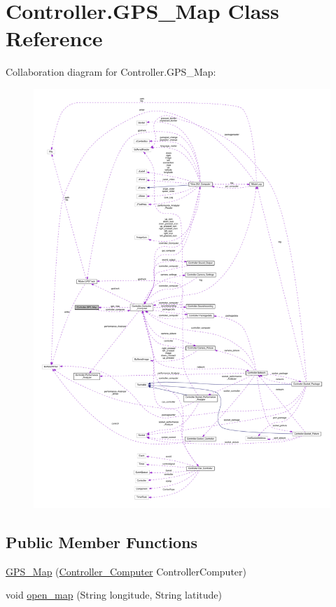 \hypertarget{class_controller_1_1_g_p_s___map}{}\section{Controller.\+G\+P\+S\+\_\+\+Map Class Reference}
\label{class_controller_1_1_g_p_s___map}


Collaboration diagram for Controller.\+G\+P\+S\+\_\+\+Map\+:
\nopagebreak
\begin{figure}[H]
\begin{center}
\leavevmode
\includegraphics[width=350pt]{class_controller_1_1_g_p_s___map__coll__graph}
\end{center}
\end{figure}
\subsection*{Public Member Functions}
\begin{DoxyCompactItemize}
\item 
\hyperlink{class_controller_1_1_g_p_s___map_a8e67453476139ace5eff961e3bb82a21}{G\+P\+S\+\_\+\+Map} (\hyperlink{class_controller_1_1_controller___computer}{Controller\+\_\+\+Computer} Controller\+Computer)
\item 
void \hyperlink{class_controller_1_1_g_p_s___map_a3464e3a900a1d878cb4487448b23fd7b}{open\+\_\+map} (String longitude, String latitude)
\end{DoxyCompactItemize}


